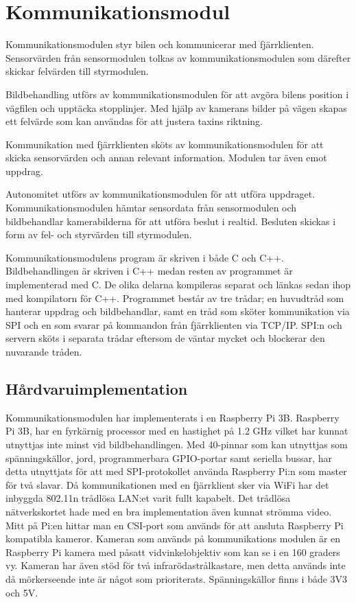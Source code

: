 \documentclass[tekniskrapport/tech.tex]{subfiles}
\begin{document}
\section{Kommunikationsmodul}
Kommunikationsmodulen styr bilen och kommunicerar med fjärrklienten.
Sensorvärden från sensormodulen tolkas av kommunikationsmodulen som därefter
skickar felvärden till styrmodulen.

Bildbehandling utförs av kommunikationsmodulen för att
avgöra bilens position i vägfilen och upptäcka stopplinjer. Med hjälp av
kamerans bilder på vägen skapas ett felvärde som kan användas för att justera
taxins riktning.

Kommunikation med fjärrklienten sköts av kommunikationsmodulen för
att skicka sensorvärden och annan relevant information. Modulen tar
även emot uppdrag.

Autonomitet utförs av kommunikationsmodulen för att utföra uppdraget.
Kommunikationsmodulen hämtar sensordata från sensormodulen och bildbehandlar
kamerabilderna för att utföra beslut i realtid. Besluten skickas i form av fel-
och styrvärden till styrmodulen.

Kommunikationsmodulens program är skriven i både C och C++. Bildbehandlingen är
skriven i C++ medan resten av programmet är implementerad med C. De olika
delarna kompileras separat och länkas sedan ihop med kompilatorn för C++.
Programmet består av tre trådar; en huvudtråd som hanterar uppdrag och
bildbehandlar, samt en tråd som sköter kommunikation via SPI och en som svarar
på kommandon från fjärrklienten via TCP/IP. SPI:n och servern sköts i separata
trådar eftersom de väntar mycket och blockerar den nuvarande tråden.


\subsection{Hårdvaruimplementation} 
Kommunikationsmodulen har implementerats i en Raspberry Pi 3B. Raspberry Pi 3B,
har en fyrkärnig processor med en hastighet på 1.2 GHz vilket har kunnat
utnyttjas inte minst vid bildbehandlingen. Med 40-pinnar som kan utnyttjas som
spänningskällor, jord, programmerbara GPIO-portar samt seriella bussar, har
detta utnyttjats för att med SPI-protokollet använda Raspberry Pi:n som master
för två slavar. Då kommunikationen med en fjärrklient sker via WiFi har det
inbyggda 802.11n trådlösa LAN:et varit fullt kapabelt. Det trådlösa
nätverkskortet hade med en bra implementation även kunnat strömma video. Mitt
på Pi:en hittar man en CSI-port som används för att ansluta Raspberry Pi
kompatibla kameror. Kameran som används på kommunikations modulen är en
Raspberry Pi kamera med påsatt vidvinkelobjektiv som kan se i en 160 graders vy.
Kameran har även stöd för två infrarödastrålkastare, men detta används inte då
mörkerseende inte är något som prioriterats. Spänningskällor finns i både 3V3
och 5V.
\end{document}
